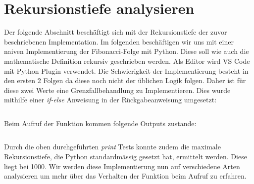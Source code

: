 \section{Rekursionstiefe analysieren}
Der folgende Abschnitt beschäftigt sich mit der Rekursionstiefe
der zuvor beschriebenen Implementation. 
Im folgenden beschäftigen wir uns mit einer naiven
Implementierung der Fibonacci-Folge mit Python.
Diese soll wie auch die mathematische Definition rekursiv geschrieben werden.
Als Editor wird VS Code mit Python Plugin verwendet.
Die Schwierigkeit der Implementierung besteht in den
ersten 2 Folgen da diese noch nicht der üblichen Logik folgen.
Daher ist für diese zwei Werte eine Grenzfallbehandlung
zu Implementieren. Dies wurde mithilfe einer \textit{if-else}
Anweisung in der Rückgabeanweisung umgesetzt:
\begin{mdframed}[backgroundcolor=bg]
    \inputminted{Python}{src/count_fibonacci.py}
\end{mdframed}
Beim Aufruf der Funktion kommen folgende Outputs zustande:
\begin{mdframed}[backgroundcolor=bg]
    \inputminted{Python}{src/count_fibonacci_test.py}
\end{mdframed}
Durch die oben durchgeführten \textit{print} Tests konnte
zudem die maximale Rekursionstiefe, die Python standardmässig
gesetzt hat, ermittelt werden. 
Diese liegt bei 1000. 
Wir werden diese Implementierung nun
auf verschiedene Arten analysieren um mehr über das 
Verhalten der Funktion beim Aufruf zu erfahren.

